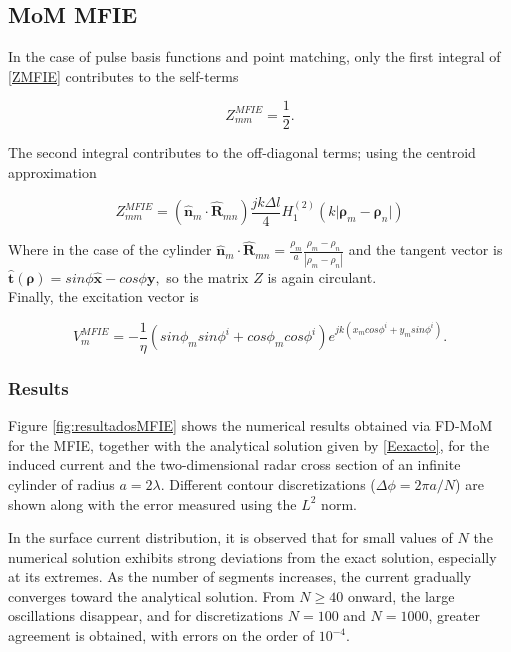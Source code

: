 \documentclass[11pt,a4paper,twoside,pdf]{article}
\numberwithin{equation}{section}
\begin{document}
\subsection{MoM MFIE}
\label{mfienum}

In the case of pulse basis functions and point matching, only the first integral of \ref{ZMFIE} contributes to the self-terms

$$
    Z^{MFIE}_{mm} = \frac{1}{2}.
$$

The second integral contributes to the off-diagonal terms; using the centroid approximation

$$
    Z^{MFIE}_{mm} = (\boldsymbol{\hat{n}}_m \cdot \boldsymbol{\hat{R}}_{mn}) \frac{jk\Delta l}{4} H_1^{(2)}\!\left( k \lvert \boldsymbol{\rho}_m - \boldsymbol{\rho}_n \rvert \right)
$$

Where in the case of the cylinder $\boldsymbol{\hat{n}}_m \cdot \boldsymbol{\hat{R}}_{mn} = \frac{\rho_m}{a} \frac{\rho_m - \rho_n}{|\rho_m - \rho_n|}$ and the tangent vector is $\boldsymbol{\hat{t}} (\boldsymbol{\rho}) = sin\phi \boldsymbol{\hat{x}} - cos\phi \boldsymbol{y},$ so the matrix $Z$ is again circulant.\\

Finally, the excitation vector is

$$
    V^{MFIE}_m = -\frac{1}{\eta} (sin\phi_m sin\phi^i + cos\phi_m cos\phi^i) e^{jk (x_m cos\phi^i + y_m sin\phi^i)}.
$$


\subsubsection{Results}




Figure \ref{fig:resultadosMFIE} shows the numerical results obtained via FD-MoM for the MFIE, together with the analytical solution given by \ref{Eexacto}, for the induced current and the two-dimensional radar cross section of an infinite cylinder of radius $a = 2\lambda$. Different contour discretizations ($\Delta \phi = 2\pi a/ N$) are shown along with the error measured using the $L^2$ norm.

In the surface current distribution, it is observed that for small values of $N$ the numerical solution exhibits strong deviations from the exact solution, especially at its extremes. As the number of segments increases, the current gradually converges toward the analytical solution. From $N \geq 40$ onward, the large oscillations disappear, and for discretizations $N = 100$ and $N = 1000$, greater agreement is obtained, with errors on the order of $10^{-4}$.
\end{document}
